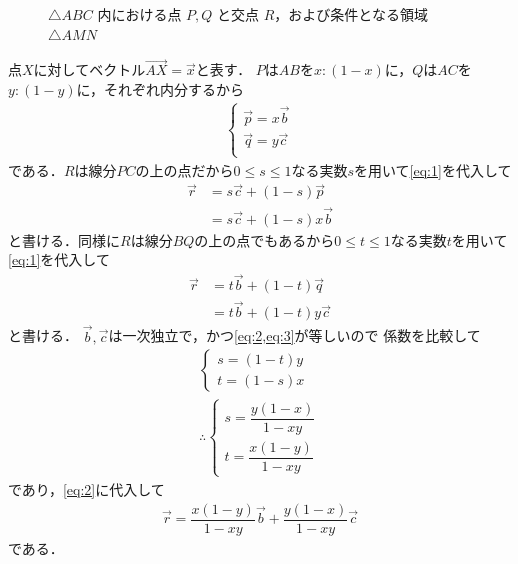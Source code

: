 \documentclass[../../main.tex]{subfiles}
\begin{document}
\begin{figure}[htb]
\begin{center}
  \end{center}
  \caption{$\triangle ABC$ 内における点 $P, Q$ と交点 $R$，および条件となる領域 $\triangle AMN$}
\end{figure}

点$X$に対してベクトル$\overrightarrow{AX}=\vec{x}$と表す．
$P$は$AB$を$x:(1-x)$に，$Q$は$AC$を$y:(1-y)$に，それぞれ内分するから
\begin{align}
  \begin{cases}
    \vec{p} = x \vec{b} \\
    \vec{q} = y \vec{c} \\
  \end{cases} \label{eq:1}
\end{align}
である．$R$は線分$PC$の上の点だから$0\le s \le 1$なる実数$s$を用いて\cref{eq:1}を代入して
\begin{align}
  \vec{r}
  &= s \vec{c} + (1-s) \vec{p} \\
  &= s \vec{c} + (1-s) x \vec{b} \label{eq:2}
\end{align}
と書ける．同様に$R$は線分$BQ$の上の点でもあるから$0\le t \le 1$なる実数$t$を用いて\cref{eq:1}を代入して
\begin{align}
  \vec{r}
  &= t \vec{b} + (1-t) \vec{q} \\
  &= t \vec{b} + (1-t) y \vec{c} \label{eq:3}
\end{align}
と書ける．
$\vec{b},\vec{c}$は一次独立で，かつ\cref{eq:2,eq:3}が等しいので 係数を比較して
\begin{align}
  \begin{cases}
    s = (1-t) y \\
    t = (1-s) x
  \end{cases} \\
  \therefore
  \begin{cases}
    s = \dfrac{y(1-x)}{1-xy} \\
    t = \dfrac{x(1-y)}{1-xy}
  \end{cases} \label{eq:4}
\end{align}
であり，\cref{eq:2}に代入して
\begin{align}
  \vec{r} = \dfrac{x(1-y)}{1-xy} \vec{b} + \dfrac{y(1-x)}{1-xy} \vec{c} \label{eq:5}
\end{align}
である．
\end{document}
